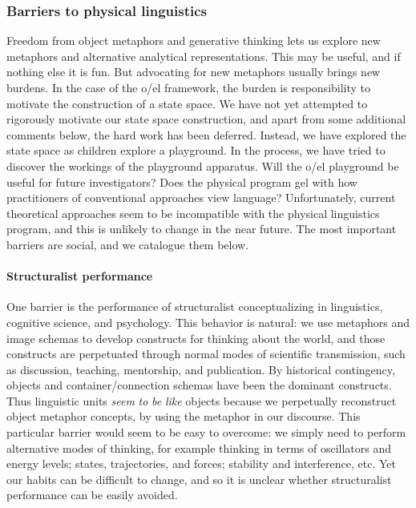 \subsubsection{Barriers to physical linguistics}

Freedom from object metaphors and generative thinking lets us explore new metaphors and alternative analytical representations. This may be useful, and if nothing else it is fun. But advocating for new metaphors usually brings new burdens. In the case of the o/el framework, the burden is responsibility to motivate the construction of a state space. We have not yet attempted to rigorously motivate our state space construction, and apart from some additional comments below, the hard work has been deferred. Instead, we have explored the state space as children explore a playground. In the process, we have tried to discover the workings of the playground apparatus. Will the o/el playground be useful for future investigators? Does the physical program gel with how practitioners of conventional approaches view language? Unfortunately, current theoretical approaches seem to be incompatible with the physical linguistics program, and this is unlikely to change in the near future. The most important barriers are social, and we catalogue them below.

\paragraph{Structuralist performance}

One barrier is the performance of structuralist conceptualizing in linguistics, cognitive science, and psychology. This behavior is natural: we use metaphors and image schemas to develop constructs for thinking about the world, and those constructs are perpetuated through normal modes of scientific transmission, such as discussion, teaching, mentorship, and publication. By historical contingency, objects and container/connection schemas have been the dominant constructs. Thus linguistic units \textit{seem} \textit{to} \textit{be} \textit{like} objects because we perpetually reconstruct object metaphor concepts, by using the metaphor in our discourse. This particular barrier would seem to be easy to overcome: we simply need to perform alternative modes of thinking, for example thinking in terms of oscillators and energy levels; states, trajectories, and forces; stability and interference, etc. Yet our habits can be difficult to change, and so it is unclear whether structuralist performance can be easily avoided.

